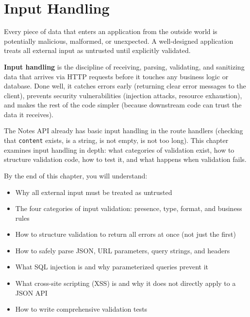 \setcounter{chapter}{30}
\chapter{Input Handling}\label{ch:31-input-handling}

\chapterrule

Every piece of data that enters an application from the outside world is potentially malicious, malformed, or unexpected. A well-designed application treats all external input as untrusted until explicitly validated.

\textbf{Input handling} is the discipline of receiving, parsing, validating, and sanitizing data that arrives via HTTP requests before it touches any business logic or database. Done well, it catches errors early (returning clear error messages to the client), prevents security vulnerabilities (injection attacks, resource exhaustion), and makes the rest of the code simpler (because downstream code can trust the data it receives).

The Notes API already has basic input handling in the route handlers (checking that \texttt{content} exists, is a string, is not empty, is not too long). This chapter examines input handling in depth: what categories of validation exist, how to structure validation code, how to test it, and what happens when validation fails.

\begin{objectives}

By the end of this chapter, you will understand:

\begin{itemize}
\tightlist
\item
  Why all external input must be treated as untrusted
\item
  The four categories of input validation: presence, type, format, and business rules
\item
  How to structure validation to return all errors at once (not just the first)
\item
  How to safely parse JSON, URL parameters, query strings, and headers
\item
  What SQL injection is and why parameterized queries prevent it
\item
  What cross-site scripting (XSS) is and why it does not directly apply to a JSON API
\item
  How to write comprehensive validation tests
\end{itemize}

\end{objectives}

